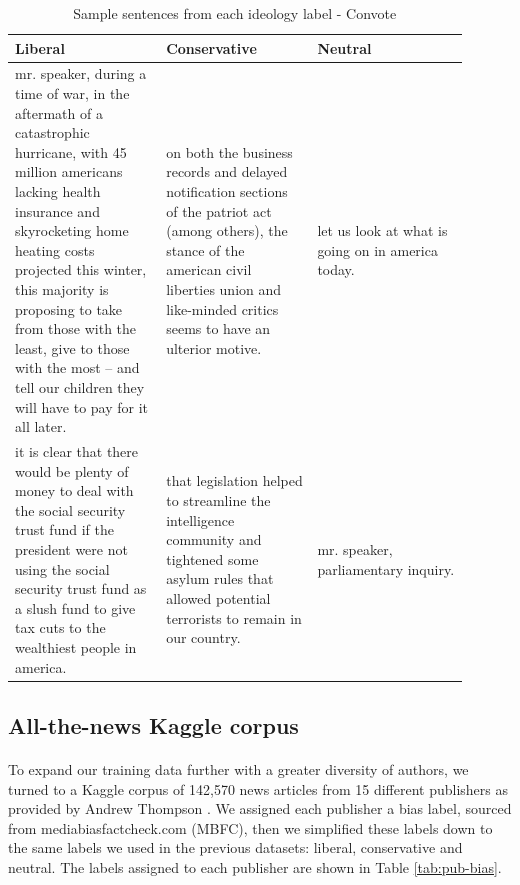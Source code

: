 \documentclass[10pt,a4paper,onecolumn]{article}
\begin{document}
\begin{table}[h!]
	\begin{center}
		\caption{Sample sentences from each ideology label - Convote}
		\label{tab:convote-sentences}
		\begin{tabular}{p{0.3\linewidth}|p{0.3\linewidth}|p{0.3\linewidth}}
			\hline\hline
			\textbf{Liberal} & \textbf{Conservative} & \textbf{Neutral}\\
			\hline
			mr. speaker, during a time of war, in the aftermath of a catastrophic hurricane, with 45 million americans lacking health insurance and skyrocketing home heating costs projected this winter, this majority is proposing to take from those with the least, give to those with the most -- and tell our children they will have to pay for it all later. & on both the business records and delayed notification sections of the patriot act (among others), the stance of the american civil liberties union and like-minded critics seems to have an ulterior motive. & let us look at what is going on in america today. \\
			it is clear that there would be plenty of money to deal with the social security trust fund if the president were not using the social security trust fund as a slush fund to give tax cuts to the wealthiest people in america. & that legislation helped to streamline the intelligence community and tightened some asylum rules that allowed potential terrorists to remain in our country. & mr. speaker, parliamentary inquiry. \\
			\hline\hline
		\end{tabular}
	\end{center}
\end{table}

\subsection{All-the-news Kaggle corpus}
\paragraph{}
To expand our training data further with a greater diversity of authors, we turned to a Kaggle corpus of 142,570 news articles from 15 different publishers as provided by Andrew Thompson \cite{news}. We assigned each publisher a bias label, sourced from mediabiasfactcheck.com (MBFC), then we simplified these labels down to the same labels we used in the previous datasets: liberal, conservative and neutral. The labels assigned to each publisher are shown in Table \ref{tab:pub-bias}. 
\end{document}
